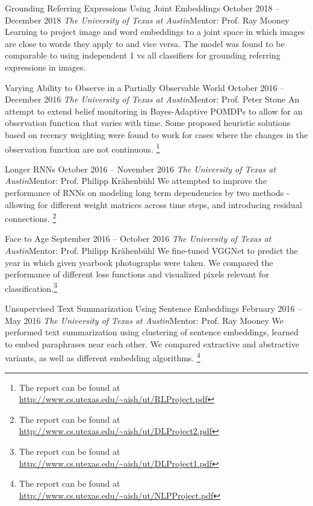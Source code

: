 \documentclass[letterpaper,10pt]{resume}
\begin{document}
{\begin{itemize}
  \credentialtwo
    {{Grounding Referring Expressions Using Joint Embeddings}}
    {\sf October 2018 -- December 2018}
    {\it The University of Texas at Austin}{\textsf{Mentor: Prof. Ray Mooney}}
    {}
    { 
    \small 
	Learning to project image and word embeddings to a joint space in which images are close to words they apply to and vice versa. The model was found to be comparable to using independent 1 vs all classifiers for grounding referring expressions in images. 
    }
   \vspace{0.2cm}


  \credentialtwo
    {{Varying Ability to Observe in a Partially Observable World}}
    {\sf October 2016 -- December 2016}
    {\it The University of Texas at Austin}{\textsf{Mentor: Prof. Peter Stone}}
    {}
    { 
    \small 
	An attempt to extend belief monitoring in Bayes-Adaptive POMDPs to allow for an observation function that varies with time. Some proposed heuristic solutions based on recency weighting were found to work for cases where the changes in the observation function are not continuous. \footnote{The report can be found at \url{http://www.cs.utexas.edu/~aish/ut/RLProject.pdf}}
    }
   \vspace{0.2cm}   

  \credentialtwo
    {{Longer RNNs}}
    {\sf October 2016 -- November 2016}
    {\it The University of Texas at Austin}{\textsf{Mentor: Prof. Philipp Kr\"ahenb\"uhl}}
    {}
    { 
    \small 
	We attempted to improve the performance of RNNs on modeling long term dependencies by two methods - allowing for different weight matrices across time steps, and introducing residual connections. \footnote{The report can be found at \url{http://www.cs.utexas.edu/~aish/ut/DLProject2.pdf}}  
    }
   \vspace{0.2cm}   
 
  \credentialtwo
    {{Face to Age}}
    {\sf September 2016 -- October 2016}
    {\it The University of Texas at Austin}{\textsf{Mentor: Prof. Philipp Kr\"ahenb\"uhl}}
    {}
    { 
    \small 
	We fine-tuned VGGNet to predict the year in which given yearbook photographs were  taken. We compared the performance of different loss functions and visualized pixels relevant for classification.\footnote{The report can be found at \url{http://www.cs.utexas.edu/~aish/ut/DLProject1.pdf}} 
    }
   \vspace{0.2cm}  
 
  \credentialtwo
    {{Unsupervised Text Summarization Using Sentence Embeddings}}
    {\sf February 2016 -- May 2016}
    {\it The University of Texas at Austin}{\textsf{Mentor: Prof. Ray Mooney}}
    {}
    { 
    \small 
	We performed text summarization using clustering of sentence embeddings, learned to embed paraphrases near each other. We compared extractive and abstractive variants, as well as different embedding algorithms. \footnote{The report can be found at \url{http://www.cs.utexas.edu/~aish/ut/NLPProject.pdf}}
    }
   \vspace{0.2cm}
   

\end{itemize}}
\end{document}
